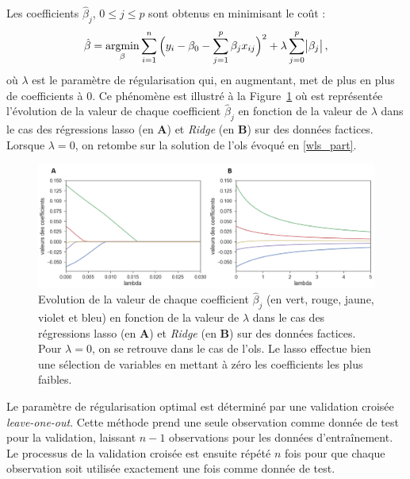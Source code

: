 Les coefficients $\hat{\beta}_{j}$, $0 \leq j \leq p$ sont obtenus en minimisant le coût :
\begin{equation}
\label{eq:factors_lasso-minimization}
\hat{\beta} = \operatorname*{argmin}_\beta \sum_{i=1}^{n} \Big(y_i - \beta_{0} - \sum_{j=1}^{p}\beta_{j}x_{ij}\Big)^2 + \lambda \sum_{j=0}^{p}\abs{\beta_{j}},
\end{equation} 
où $\lambda$ est le paramètre de régularisation qui, en augmentant, met de plus en plus de coefficients à 0. Ce phénomène est illustré à la 
Figure~\ref{Figure:factors_comparison_lasso_ridge_ols_lasso} où est représentée l'évolution de la valeur de chaque coefficient $\hat{\beta}_{j}$ en fonction de
la valeur de $\lambda$ dans le cas des régressions \gls{lasso} (en \textbf{A}) et \textit{Ridge} (en \textbf{B}) sur des données factices. Lorsque $\lambda = 0$, on retombe
sur la solution de l'\gls{ols} évoqué en \ref{wls_part}.

\begin{figure}[h!]
  \centering
	\includegraphics[width=1.0\linewidth]{figures/chapter-3/comparison-lasso-ridge-ols-lasso} 
  \caption{Evolution de la valeur de chaque coefficient $\hat{\beta}_{j}$ (en vert, rouge, jaune, violet et bleu) en fonction de
  la valeur de $\lambda$ dans le cas des régressions \gls{lasso} (en \textbf{A}) et \textit{Ridge} (en \textbf{B}) sur des données factices. Pour $\lambda = 0$, on se retrouve
  dans le cas de l'\gls{ols}. Le \gls{lasso} effectue bien une sélection de variables en mettant à zéro les coefficients les plus faibles.}
  \label{Figure:factors_comparison_lasso_ridge_ols_lasso}
\end{figure}

Le paramètre de régularisation optimal est déterminé par une validation croisée \textit{leave-one-out}. Cette méthode prend une seule observation 
comme donnée de test pour la validation, laissant $n - 1$ observations pour les données d'entraînement. Le processus de la validation croisée est 
ensuite répété $n$ fois pour que chaque observation soit utilisée exactement une fois comme donnée de test. 


